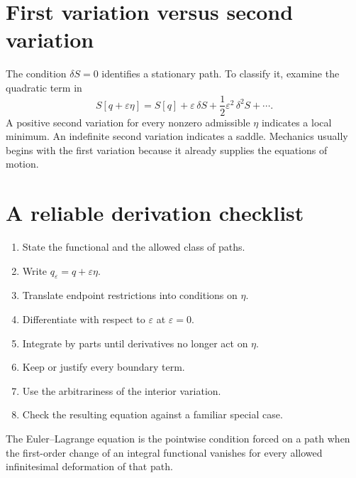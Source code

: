 \documentclass[11pt,a4paper]{article}
\begin{document}
\section{First variation versus second variation}

The condition $\delta S=0$ identifies a stationary path. To classify it, examine the quadratic term in
\[
S[q+\varepsilon\eta]
=S[q]+\varepsilon\,\delta S
+\frac12\varepsilon^2\,\delta^2S+\cdots.
\]
A positive second variation for every nonzero admissible $\eta$ indicates a local minimum. An indefinite second variation indicates a saddle. Mechanics usually begins with the first variation because it already supplies the equations of motion.

\section{A reliable derivation checklist}

\begin{enumerate}
\item State the functional and the allowed class of paths.
\item Write $q_\varepsilon=q+\varepsilon\eta$.
\item Translate endpoint restrictions into conditions on $\eta$.
\item Differentiate with respect to $\varepsilon$ at $\varepsilon=0$.
\item Integrate by parts until derivatives no longer act on $\eta$.
\item Keep or justify every boundary term.
\item Use the arbitrariness of the interior variation.
\item Check the resulting equation against a familiar special case.
\end{enumerate}

\begin{checkBox}
The Euler--Lagrange equation is the pointwise condition forced on a path when the first-order change of an integral functional vanishes for every allowed infinitesimal deformation of that path.
\end{checkBox}
\end{document}

